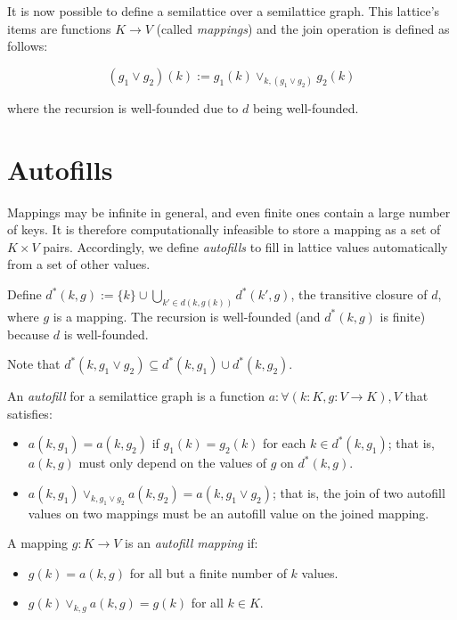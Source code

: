 \documentclass{article}
\begin{document}
        It is now possible to define a semilattice over a semilattice graph. This lattice's items are functions $K \rightarrow V$ (called \emph{mappings}) and the join operation is defined as follows:

        $$ (g_1 \vee g_2)(k) := g_1(k) \vee_{k, (g_1 \vee g_2)} g_2(k) $$

        where the recursion is well-founded due to $d$ being well-founded.

    \section{Autofills}

        Mappings may be infinite in general, and even finite ones contain a large number of keys. It is therefore computationally infeasible to store a mapping as a set of $K \times V$ pairs. Accordingly, we define \emph{autofills} to fill in lattice values automatically from a set of other values.


        Define $d^*(k, g) := \{k\} \cup \bigcup_{k' \in d(k, g(k))} d^*(k', g)$, the transitive closure of $d$, where $g$ is a mapping. The recursion is well-founded (and $d^*(k, g)$ is finite) because $d$ is well-founded.

        Note that $d^*(k, g_1 \vee g_2) \subseteq d^*(k, g_1) \cup d^*(k, g_2)$.

        An \emph{autofill} for a semilattice graph is a function $a : \forall (k:K, g: V \rightarrow K), V$ that satisfies:

        \begin{itemize}
          \item
            $a(k, g_1) = a(k, g_2)$ if $g_1(k) = g_2(k)$ for each $k \in d^*(k, g_1)$; that is, $a(k, g)$ must only depend on the values of $g$ on $d^*(k, g)$.
          \item
            $a(k, g_1) \vee_{k, g_1 \vee g_2} a(k, g_2) = a(k, g_1 \vee g_2)$; that is, the join of two autofill values on two mappings must be an autofill value on the joined mapping.
        \end{itemize}

        A mapping $g : K \rightarrow V$ is an \emph{autofill mapping} if:
        
        \begin{itemize}
          \item $g(k) = a(k, g)$ for all but a finite number of $k$ values.
          \item $g(k) \vee_{k, g} a(k, g) = g(k)$ for all $k \in K$.
        \end{itemize}
\end{document}
